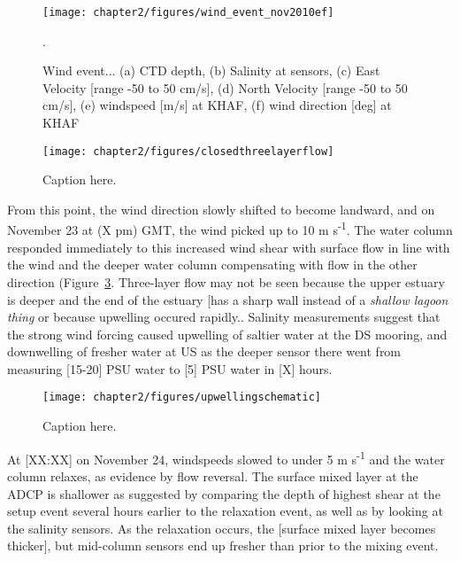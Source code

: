 \begin{figure}[t]
	\centering
	\texttt{[image: chapter2/figures/wind\_event\_nov2010ef]}
\caption{Wind event... (a) CTD depth, (b) Salinity at sensors, (c) East Velocity [range -50 to 50 cm/s], (d) North Velocity [range -50 to 50 cm/s], (e) windspeed [m/s] at KHAF, (f) wind direction [deg] at KHAF}.
\label{fig:closed_UVwindsalt}
\end{figure}


\begin{figure}
	\centering
	\texttt{[image: chapter2/figures/closedthreelayerflow]}
\caption{Caption here.} \label{fig:schematic3lf}
\end{figure}


From this point, the wind direction slowly shifted to become landward, and on November 23 at (X pm) GMT, the wind picked up to 10 m s\textsuperscript{-1}. The water column responded immediately to this increased wind shear with surface flow in line with the wind and the  deeper water column compensating with flow in the other direction (Figure~\ref{fig:schematicupwelling}. Three-layer flow may not be seen because the upper estuary is deeper and the end of the estuary [has a sharp wall instead of a \emph{shallow lagoon thing} or because upwelling occured rapidly.. Salinity measurements suggest that the strong wind forcing caused upwelling of saltier water at the DS mooring, and downwelling of fresher water at US as the deeper sensor there went from measuring [15-20] PSU water to [5] PSU water in [X] hours.


\begin{figure}
\centering
	\texttt{[image: chapter2/figures/upwellingschematic]}
\caption{Caption here.} \label{fig:schematicupwelling}
\end{figure}

At [XX:XX] on November 24, windspeeds slowed to under 5 m s\textsuperscript{-1} and the water column relaxes, as evidence by flow reversal. The surface mixed layer at the ADCP is shallower as suggested by comparing the depth of highest shear at the setup event several hours earlier to the relaxation event, as well as by looking at the salinity sensors. As the relaxation occurs, the [surface mixed layer becomes
thicker], but mid-column sensors end up fresher than prior to the mixing event. 

